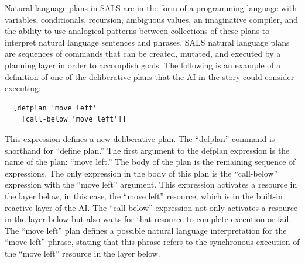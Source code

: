 Natural language plans in SALS are in the form of a programming
language with variables, conditionals, recursion, ambiguous values, an
imaginative compiler, and the ability to use analogical patterns
between collections of these plans to interpret natural language
sentences and phrases.  SALS natural language plans are sequences of
commands that can be created, mutated, and executed by a planning
layer in order to accomplish goals.  The following is an example of a
definition of one of the deliberative plans that the AI in the story
could consider executing:
\begin{samepage}
\begin{Verbatim}
  [defplan 'move left'
    [call-below 'move left']]
\end{Verbatim}
\end{samepage}
This expression defines a new deliberative plan.  The ``defplan''
command is shorthand for ``define plan.''  The first argument to the
defplan expression is the name of the plan: ``move left.''  The body
of the plan is the remaining sequence of expressions.  The only
expression in the body of this plan is the ``call-below'' expression
with the ``move left'' argument.  This expression activates a resource
in the layer below, in this case, the ``move left'' resource, which is
in the built-in reactive layer of the AI.  The ``call-below''
expression not only activates a resource in the layer below but also
waits for that resource to complete execution or fail.  The ``move
left'' plan defines a possible natural language interpretation for the
``move left'' phrase, stating that this phrase refers to the
synchronous execution of the ``move left'' resource in the layer
below.

